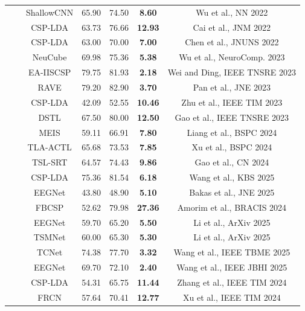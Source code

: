 \documentclass[journal]{IEEEtran}
\begin{document}
\begin{table}[htbp]
\begin{tabular}{c|c|c|c|c|c|c}
&& ShallowCNN & 65.90 & 74.50 & \textbf{8.60} & Wu et al., NN 2022 \cite{drwuTLBCI2022} \\
&& CSP-LDA & 63.73 & 76.66 & \textbf{12.93} & Cai et al., JNM 2022 \cite{Cai2022JNM}  \\
&& CSP-LDA & 63.00 & 70.00 & \textbf{7.00} & Chen et al., JNUNS 2022 \cite{Chen2022JNUNS}  \\
&& NeuCube & 69.98 & 75.36 & \textbf{5.38} & Wu et al., NeuroComp. 2023 \cite{Wu2023NeuroCom} \\
&& EA-IISCSP & 79.75 & 81.93 & \textbf{2.18} & Wei and Ding, IEEE TNSRE 2023 \cite{Wei2023TNSRE} \\
&& RAVE & 79.20 & 82.90 & \textbf{3.70} & Pan et al., JNE 2023 \cite{Pan2023JNE} \\
&& CSP-LDA & 42.09 & 52.55 & \textbf{10.46} & Zhu et al., IEEE TIM 2023 \cite{Zhu2023TIM} \\
&& DSTL & 67.50 & 80.00 & \textbf{12.50} & Gao et al., IEEE TNSRE 2023 \cite{Gao2023TNSRE}  \\
&& MEIS & 59.11 & 66.91 & \textbf{7.80} & Liang et al., BSPC 2024 \cite{Liang2024BSPC}  \\
&& TLA-ACTL & 65.68 & 73.53 & \textbf{7.85} & Xu et al., BSPC 2024 \cite{Liang2024BSPC}  \\
&& TSL-SRT & 64.57 & 74.43 & \textbf{9.86} & Gao et al., CN 2024 \cite{Gao2024CogNeuro}   \\
&& CSP-LDA & 75.36 & 81.54 & \textbf{6.18} & Wang et al., KBS 2025 \cite{drwuTFT2025} \\
&& EEGNet & 43.80 & 48.90 & \textbf{5.10} & Bakas et al., JNE 2025 \cite{Bakas2025} \\
&& FBCSP & 52.62 & 79.98 & \textbf{27.36} & Amorim et al., BRACIS 2024 \cite{Amorim2024BRACIS} \\
&& EEGNet & 59.70 & 65.20 & \textbf{5.50} & Li et al., ArXiv 2025 \cite{Li2024spdim} \\
&& TSMNet & 60.00 & 65.30 & \textbf{5.30} & Li et al., ArXiv 2025 \cite{Li2024spdim} \\
&& TCNet & 74.38 & 77.70 & \textbf{3.32} & Wang et al., IEEE TBME 2025 \cite{Wang2024TBME}  \\
&& EEGNet & 69.70 & 72.10 & \textbf{2.40} & Wang et al., IEEE JBHI 2025 \cite{Wang2024JBHI} \\
&& CSP-LDA & 54.31 & 65.75 & \textbf{11.44} & Zhang et al., IEEE TIM 2024 \cite{Zhang2024TIM}  \\
&& FRCN & 57.64 & 70.41 & \textbf{12.77} & Xu et al., IEEE TIM 2024 \cite{Xu2024TIM}  \\

\end{tabular}
\end{table}
\end{document}
